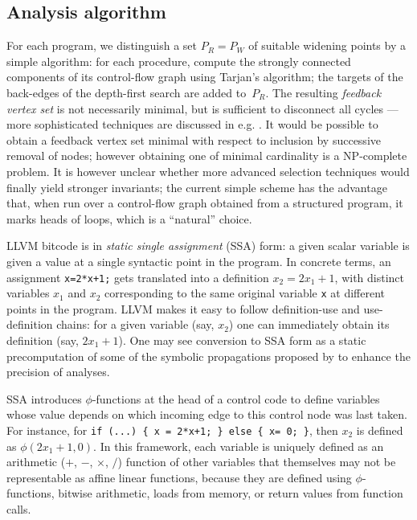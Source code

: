 \documentclass{entcs}
\begin{document}
\subsection{Analysis algorithm}
\label{sec:analysis-algorithm}
For each program, we distinguish a set $P_R = P_W$ of suitable widening points by a simple algorithm: for each procedure, compute the strongly connected components of its control-flow graph using Tarjan's algorithm; the targets of the back-edges of the depth-first search are added to~$P_R$.
The resulting \emph{feedback vertex set} is not necessarily minimal, but is sufficient to disconnect all cycles --- more sophisticated techniques are discussed in e.g. \citet{BourdonclePhd}.
It would be possible to obtain a feedback vertex set minimal with respect to inclusion by successive removal of nodes; however obtaining one of minimal cardinality is a NP-complete problem.
It is however unclear whether more advanced selection techniques would finally yield stronger invariants; the current simple scheme has the advantage that, when run over a control-flow graph obtained from a structured program, it marks heads of loops, which is a ``natural'' choice.

LLVM bitcode is in \emph{static single assignment} (SSA) form: a given scalar variable is given a value at a single syntactic point in the program. In concrete terms, an assignment \lstinline|x=2*x+1;| gets translated into a definition $x_2 = 2x_1+1$, with distinct variables $x_1$ and $x_2$ corresponding to the same original variable \lstinline|x| at different points in the program.
LLVM makes it easy to follow definition-use and use-definition chains: for a given variable (say, $x_2$) one can immediately obtain its definition (say, $2x_1+1$).
One may see conversion to SSA form as a static precomputation of some of the symbolic propagations proposed by \citet{DBLP:conf/vmcai/Mine06} to enhance the precision of analyses.

SSA introduces $\phi$-functions at the head of a control code to define variables whose value depends on which incoming edge to this control node was last taken. For instance, for \lstinline|if (...) { x = 2*x+1; } else { x= 0; }|, then $x_2$ is defined as $\phi(2x_1+1,0)$. In this framework, each variable is uniquely defined as an arithmetic ($+$, $-$, $\times$, $/$) function of other variables that themselves may not be representable as affine linear functions, because they are defined using $\phi$-functions, bitwise arithmetic, loads from memory, or return values from function calls.
\end{document}
